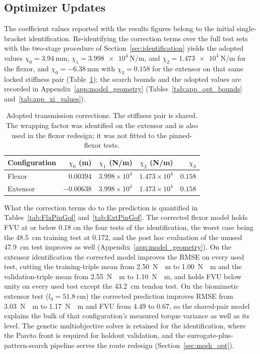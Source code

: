 \subsection{Optimizer Updates}\label{sec:ongoing}

The coefficient values reported with the results figures belong to the initial single-bracket identification. Re-identifying the correction terms over the full test sets with the two-stage procedure of Section~\ref{sec:identification} yields the adopted values $\chi_{0} = \qty{+3.94}{\mm}$, $\chi_{1} = \qty{3.998e4}{\N\per\m}$, and $\chi_{2} = \qty{1.473e4}{\N\per\m}$ for the flexor, and $\chi_{0} = \qty{-6.38}{\mm}$ with $\chi_{3} = 0.158$ for the extensor on that same locked stiffness pair (Table~\ref{tab:AdoptedXi}); the search bounds and the adopted values are recorded in Appendix~\ref{app:model_geometry} (Tables~\ref{tab:app_opt_bounds} and~\ref{tab:app_xi_values}).

\begin{table}[htbp]
\centering\small
\caption{Adopted transmission corrections. The stiffness pair is shared. The wrapping factor was identified on the extensor and is also used in the flexor redesign; it was not fitted to the pinned-flexor tests.}
\label{tab:AdoptedXi}
\begin{tabular}{@{}lrrrr@{}}
\toprule
Configuration & $\chi_{0}$ (m) & $\chi_{1}$ (N/m) & $\chi_{2}$ (N/m) & $\chi_{3}$\\
\midrule
Flexor & $0.00394$ & $3.998\times10^{4}$ & $1.473\times10^{4}$ & $0.158$\\
Extensor & $-0.00638$ & $3.998\times10^{4}$ & $1.473\times10^{4}$ & $0.158$\\
\bottomrule
\end{tabular}
\end{table} What the correction terms do to the prediction is quantified in Tables~\ref{tab:FlxPinGof} and~\ref{tab:ExtPinGof}. The corrected flexor model holds FVU at or below 0.18 on the four tests of the identification, the worst case being the \qty{48.5}{\cm} training test at 0.172, and the post hoc evaluation of the unused \qty{47.9}{\cm} test improves as well (Appendix~\ref{app:model_geometry}). On the extensor identification the corrected model improves the RMSE on every used test, cutting the training-triple mean from \qty{2.50}{\newton\cdot\meter} to \qty{1.00}{\newton\cdot\meter} and the validation-triple mean from \qty{2.55}{\newton\cdot\meter} to \qty{1.10}{\newton\cdot\meter}, and holds FVU below unity on every used test except the \qty{43.2}{\cm} tendon test. On the biomimetic extensor test ($l_{0} = \qty{51.8}{\cm}$) the corrected prediction improves RMSE from \qty{3.03}{\newton\cdot\meter} to \qty{1.17}{\newton\cdot\meter} and FVU from 4.49 to 0.67, so the shared-pair model explains the bulk of that configuration's measured torque variance as well as its level. The genetic multiobjective solver is retained for the identification, where the Pareto front is required for holdout validation, and the surrogate-plus-pattern-search pipeline serves the route redesign (Section~\ref{sec:mesh_opt}).

